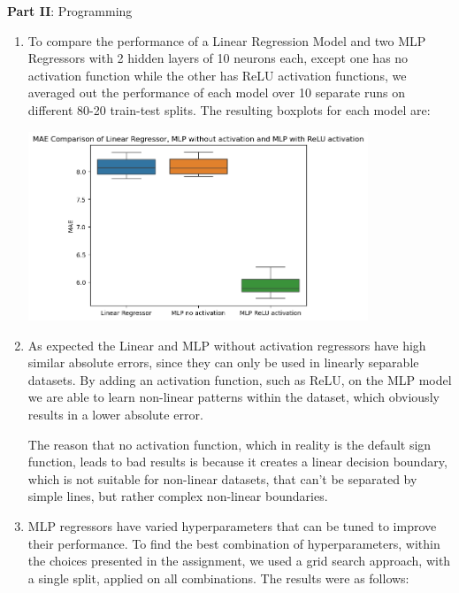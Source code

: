 \documentclass[12pt]{article}
\begin{document}
\large{\textbf{Part II}: Programming}\normalsize
\begin{enumerate}[leftmargin=\labelsep, label=\textbf{\arabic*.)},start=5]
    \item To compare the performance of a Linear Regression Model and two MLP Regressors with 2 hidden layers of 10 neurons each, except one has no activation function while the other has ReLU activation functions, we averaged out the performance of each model over 10 separate runs on different 80-20 train-test splits. The resulting boxplots for each model are:

          \begin{center}
              \includegraphics[width=0.8\textwidth]{boxplot_models_MAE.png}
          \end{center}

    \item As expected the Linear and MLP without activation regressors have high similar absolute errors, since they can only be used in linearly separable datasets. By adding an activation function, such as ReLU, on the MLP model we are able to learn non-linear patterns within the dataset, which obviously results in a lower absolute error.

          The reason that no activation function, which in reality is the default sign function, leads to bad results is because it creates a linear decision boundary, which is not suitable for non-linear datasets, that can't be separated by simple lines, but rather complex non-linear boundaries.

    \item MLP regressors have varied hyperparameters that can be tuned to improve their performance. To find the best combination of hyperparameters, within the choices presented in the assignment, we used a grid search approach, with a single split, applied on all combinations. The results were as follows:


\end{enumerate}
\end{document}
